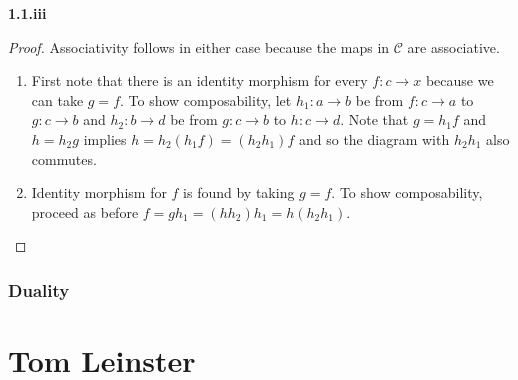 \documentclass{scrbook}
\newcommand{\hi}[1]{{\color{blue}\textbf{#1}}}
\begin{document}
\hi{1.1.iii}
\begin{proof}
Associativity follows in either case because the maps in
$\mathcal C$ are associative.
  \begin{enumerate}[label=(\roman*)]
    \item First note that there is an identity morphism for
      every $f: c \to x$ because we can take $g = f$. To
      show composability, let $h_1: a \to b$ be from $f: c \to a$ to
      $g: c \to b$ and $h_2: b \to d$ be from $g: c \to b$ to $h: c
      \to d$. Note that $g = h_1f$ and $h = h_2 g$ implies
      $h = h_2(h_1f) = (h_2h_1)f$ and so the diagram with
      $h_2h_1$ also commutes.

    \item Identity morphism for $f$ is found by taking $g =
      f$. To show composability, proceed as before $f = gh_1
      = (hh_2)h_1 = h(h_2h_1)$.
  \end{enumerate}  
\end{proof}

\section{Duality}

\part{Tom Leinster}
\end{document}
